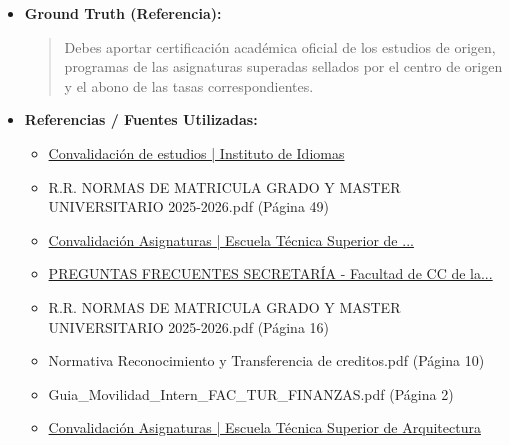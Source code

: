 \documentclass[12pt,a4paper,oneside]{report}
\begin{document}
\begin{itemize}
\begin{itemize}
\begin{quote}
Recuerda que es importante consultar la \textbf{Secretaría Virtual} de la Universidad de Sevilla o la \textbf{plataforma SEVIUS} para obtener más información y verificar los plazos y requisitos específicos para la convalidación de asignaturas.
                \end{quote}
          \item \textbf{{Ground Truth (Referencia):}} \\
                \begin{quote}
Debes aportar certificación académica oficial de los estudios de origen, programas de las asignaturas superadas sellados por el centro de origen y el abono de las tasas correspondientes.
                \end{quote}
          \item \textbf{{Referencias / Fuentes Utilizadas:}} \\
                \begin{itemize}
                  \item \href{https://institutodeidiomas.us.es/secretaria/tramites-administrativos/convalidaciones}{Convalidación de estudios | Instituto de Idiomas}
                  \item R.R. NORMAS DE MATRICULA GRADO Y MASTER UNIVERSITARIO 2025-2026.pdf (Página 49)
                  \item \href{https://etsa.us.es/escuela/convalidacion-asignaturas}{Convalidación Asignaturas | Escuela Técnica Superior de ...}
                  \item \href{https://fcce.us.es/en/el-centro/secretaria-administracion/secretaria/103-el-centro/1-2-secretaria-administracion/1-2-0-secretaria-del-centro/691-preguntas-frecuentes-secretaria}{PREGUNTAS FRECUENTES SECRETARÍA - Facultad de CC de la...}
                  \item R.R. NORMAS DE MATRICULA GRADO Y MASTER UNIVERSITARIO 2025-2026.pdf (Página 16)
                  \item Normativa Reconocimiento y Transferencia de creditos.pdf (Página 10)
                  \item Guia\_Movilidad\_Intern\_FAC\_TUR\_FINANZAS.pdf (Página 2)
                  \item \href{https://arquitectura.us.es/escuela/convalidacion-asignaturas}{Convalidación Asignaturas | Escuela Técnica Superior de Arquitectura}
                \end{itemize}
        \end{itemize}


\end{itemize}
\end{document}
